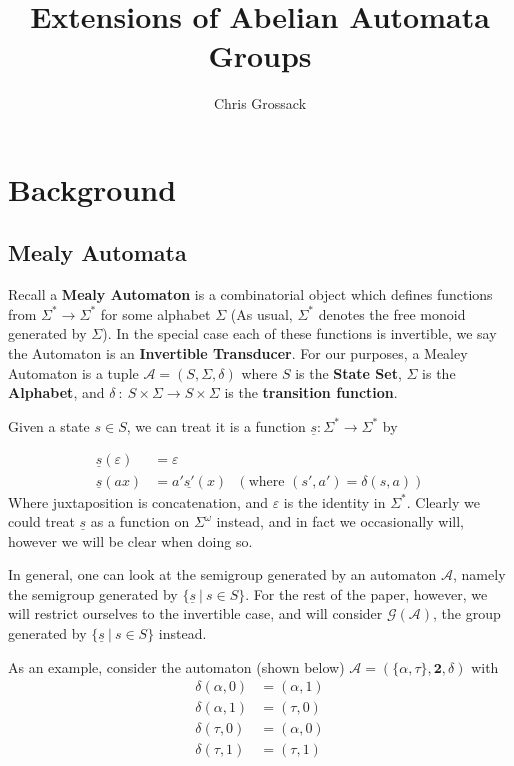 \documentclass[12pt]{article}
\title{Extensions of Abelian Automata Groups}
\author{Chris Grossack}
\newcommand{\A}{\mathcal{A}}
\newcommand{\G}{\mathcal{G}}
\newcommand{\2}{\textbf{2}}
\begin{document}
\maketitle

\section{Background}

\subsection{Mealy Automata}
Recall a \textbf{Mealy Automaton} is a combinatorial object which defines
functions from $\Sigma^* \to \Sigma^*$ for some alphabet $\Sigma$
(As usual, $\Sigma^*$ denotes the free monoid generated by $\Sigma$).
In the special case each of these functions is invertible, we say the
Automaton is an \textbf{Invertible Transducer}. For our purposes, 
a Mealey Automaton is a tuple 
$\A = (S, \Sigma, \delta)$
where $S$ is the \textbf{State Set}, $\Sigma$ is the \textbf{Alphabet},
and $\delta~:~S \times \Sigma \to S \times \Sigma$ is the
\textbf{transition function}.

Given a state $s \in S$, we can treat it is a function 
$\underline{s} : \Sigma^* \to \Sigma^*$ by 

\begin{align*}
  \underline{s}(\varepsilon) &= \varepsilon\\
  \underline{s}(ax)       &= a' \underline{s'}(x) 
  ~~~(\text{where } (s', a') = \delta(s,a))
\end{align*}
Where juxtaposition is concatenation, and $\varepsilon$ is
the identity in $\Sigma^*$.
Clearly we could treat $\underline{s}$ as a function on $\Sigma^\omega$ 
instead, and in fact we occasionally will, however we will be 
clear when doing so.

In general, one can look at the semigroup generated by an automaton $\A$,
namely the semigroup generated by $\{ \underline{s}~|~s \in S \}$.
For the rest of the paper, however, we will restrict ourselves to the
invertible case, and will consider $\G(\A)$, the group generated by 
$\{ \underline{s}~|~s \in S \}$ instead.

As an example, consider the automaton (shown below)
$\A = (\{ \alpha, \tau \}, \2, \delta)$
with 
\begin{align*}
  \delta(\alpha,0) &= (\alpha,1)\\
  \delta(\alpha,1) &= (\tau,0)\\
  \delta(\tau,0)   &= (\alpha,0)\\
  \delta(\tau,1)   &= (\tau,1)
\end{align*}
\end{document}

